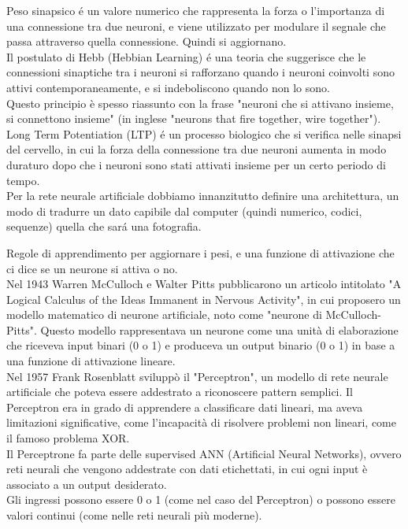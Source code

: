 Peso sinapsico é un valore numerico che rappresenta la forza o l'importanza di una connessione tra due neuroni,
e viene utilizzato per modulare il segnale che passa attraverso quella connessione. Quindi si aggiornano.\\

Il postulato di Hebb (Hebbian Learning) é una teoria che suggerisce che le connessioni sinaptiche tra i neuroni si rafforzano 
quando i neuroni coinvolti sono attivi contemporaneamente, e si indeboliscono quando non lo sono.\\
Questo principio è spesso riassunto con la frase "neuroni che si attivano insieme, si connettono insieme" 
(in inglese "neurons that fire together, wire together").\\

Long Term Potentiation (LTP) é un processo biologico che si verifica nelle sinapsi del cervello, 
in cui la forza della connessione tra due neuroni aumenta in modo duraturo dopo che i neuroni sono 
stati attivati insieme per un certo periodo di tempo.\\

Per la rete neurale artificiale dobbiamo innanzitutto definire una architettura, un modo di tradurre un dato
capibile dal computer (quindi numerico, codici, sequenze) quella che sará una fotografia.

Regole di apprendimento per aggiornare i pesi, e una funzione di attivazione che ci dice se un neurone si attiva o no.\\

Nel 1943 Warren McCulloch e Walter Pitts pubblicarono un articolo intitolato "A Logical Calculus of the Ideas Immanent in Nervous Activity",
in cui proposero un modello matematico di neurone artificiale, noto come "neurone di McCulloch-Pitts".
Questo modello rappresentava un neurone come una unità di elaborazione che riceveva input binari (0 o 1) e produceva 
un output binario (0 o 1) in base a una funzione di attivazione lineare.\\
Nel 1957 Frank Rosenblatt sviluppò il "Perceptron", un modello di rete neurale artificiale che 
poteva essere addestrato a riconoscere pattern semplici. Il Perceptron era in grado di apprendere a classificare
dati lineari, ma aveva limitazioni significative, come l'incapacità di risolvere problemi non lineari, come il famoso problema XOR.\\

Il Perceptrone fa parte delle supervised ANN (Artificial Neural Networks), ovvero reti neurali che vengono addestrate
con dati etichettati, in cui ogni input è associato a un output desiderato.\\
Gli ingressi possono essere 0 o 1 (come nel caso del Perceptron) o possono essere valori continui (come nelle reti neurali più moderne).\\

